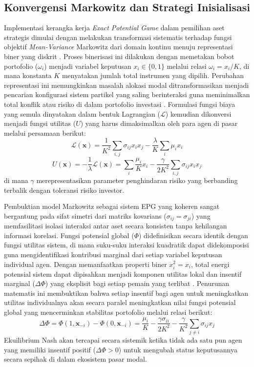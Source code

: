 \subsection{Konvergensi Markowitz dan Strategi Inisialisasi}
Implementasi kerangka kerja \textit{Exact Potential Game} dalam pemilihan aset strategis dimulai dengan melakukan transformasi sistematis terhadap fungsi objektif \textit{Mean-Variance} Markowitz dari domain kontinu menuju representasi biner yang diskrit \cite{markowitz_portfolio_1952}. Proses binerisasi ini dilakukan dengan memetakan bobot portofolio ($\omega_i$) menjadi variabel keputusan $x_i \in \{0, 1\}$ melalui relasi $\omega_i = x_i / K$, di mana konstanta $K$ menyatakan jumlah total instrumen yang dipilih. Perubahan representasi ini memungkinkan masalah alokasi modal ditransformasikan menjadi pencarian konfigurasi sistem partikel yang saling berinteraksi guna meminimalkan total konflik atau risiko di dalam portofolio investasi \cite{abdul_hali_markowitz_2020}. Formulasi fungsi biaya yang semula dinyatakan dalam bentuk Lagrangian ($\mathcal{L}$) kemudian dikonversi menjadi fungsi utilitas ($U$) yang harus dimaksimalkan oleh para agen di pasar melalui persamaan berikut:
\begin{equation}
\mathcal{L}(\mathbf{x}) = \frac{1}{K^2} \sum_{i,j} \sigma_{ij} x_i x_j - \frac{\lambda}{K} \sum_i \mu_i x_i
\end{equation}
\begin{equation}
U(\mathbf{x}) = - \frac{1}{\lambda} \mathcal{L}(\mathbf{x}) = \sum_i \frac{\mu_i}{K} x_i - \frac{\gamma}{2K^2} \sum_{i,j} \sigma_{ij} x_i x_j
\end{equation}
di mana $\gamma$ merepresentasikan parameter penghindaran risiko yang berbanding terbalik dengan toleransi risiko investor.

Pembuktian model Markowitz sebagai sistem EPG yang koheren sangat bergantung pada sifat simetri dari matriks kovarians ($\sigma_{ij} = \sigma_{ji}$) yang memfasilitasi isolasi interaksi antar aset secara konsisten tanpa kehilangan informasi korelasi. Fungsi potensial global ($\Phi$) didefinisikan secara identik dengan fungsi utilitas sistem, di mana suku-suku interaksi kuadratik dapat didekomposisi guna mengidentifikasi kontribusi marginal dari setiap variabel keputusan individual agen. Dengan memanfaatkan properti biner $x_i^2 = x_i$, total energi potensial sistem dapat dipisahkan menjadi komponen utilitas lokal dan insentif marginal ($\Delta \Phi$) yang eksplisit bagi setiap pemain yang terlibat \cite{monderer_potential_1996}. Penurunan matematis ini membuktikan bahwa setiap insentif bagi agen untuk meningkatkan utilitas individualnya akan secara paralel meningkatkan nilai fungsi potensial global yang mencerminkan stabilitas portofolio melalui relasi berikut:
\begin{equation}
\Delta \Phi = \Phi(1, \mathbf{x}_{-i}) - \Phi(0, \mathbf{x}_{-i}) = \frac{\mu_i}{K} - \frac{\gamma \sigma_{ii}}{2K^2} - \frac{\gamma}{K^2} \sum_{j \neq i} \sigma_{ij} x_j
\end{equation}
Ekuilibrium Nash akan tercapai secara sistemik ketika tidak ada satu pun agen yang memiliki insentif positif ($\Delta \Phi > 0$) untuk mengubah status keputusannya secara sepihak di dalam ekosistem pasar modal.

